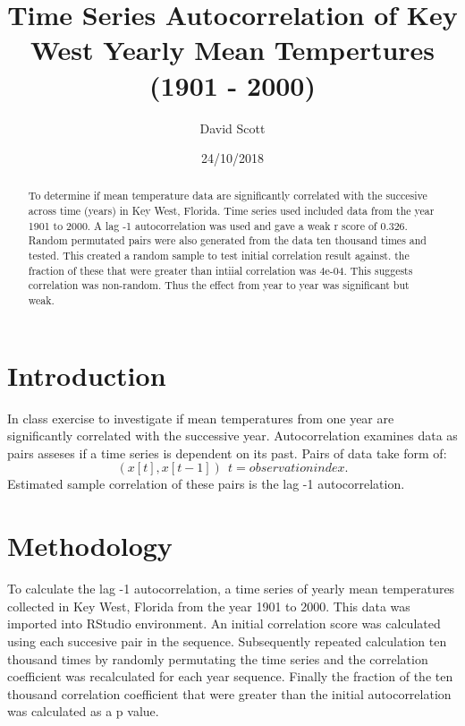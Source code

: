 \documentclass[12pt]{article}
\title{Time Series Autocorrelation of Key West Yearly Mean Tempertures (1901 - 2000)}
\author{David Scott}
\date{24/10/2018}
\begin{document}
    \maketitle

    \begin{abstract}
        To determine if mean temperature data are significantly correlated with the succesive across time (years) in Key West, Florida. 
        Time series used included data from the year 1901 to 2000. A lag -1 autocorrelation was used and gave a weak r score of 0.326. Random permutated pairs were also 
        generated from the data ten thousand times and tested. This created a random sample to test initial correlation result against. the fraction of these 
        that were greater than intiial correlation was 4e-04. This suggests correlation was non-random. Thus the effect from year to year was significant but weak.  
    \end{abstract} 

    \section{Introduction}
        In class exercise to investigate if mean temperatures from one year are
        significantly correlated with the successive year. 
        Autocorrelation examines data as pairs asseses if a time series is 
        dependent on its past. Pairs of data take form of:
        \begin{equation}
        (x[t],x[t-1]) \  \
        t = observation index. 
        \end{equation}
        Estimated sample correlation of these pairs is the lag -1 autocorrelation. 

    \section{Methodology}
        To calculate the lag -1 autocorrelation, a time series of yearly mean temperatures collected in Key West, 
        Florida from the year 1901 to 2000. This data was imported into RStudio environment. 
        An initial correlation score was calculated using each succesive pair in the sequence. 
        Subsequently repeated calculation ten thousand times by randomly permutating the time series and
        the correlation coefficient was recalculated for each year sequence. Finally the 
        fraction of the ten thousand correlation coefficient that were greater than the 
        initial autocorrelation was calculated as a p value. 
\end{document}
